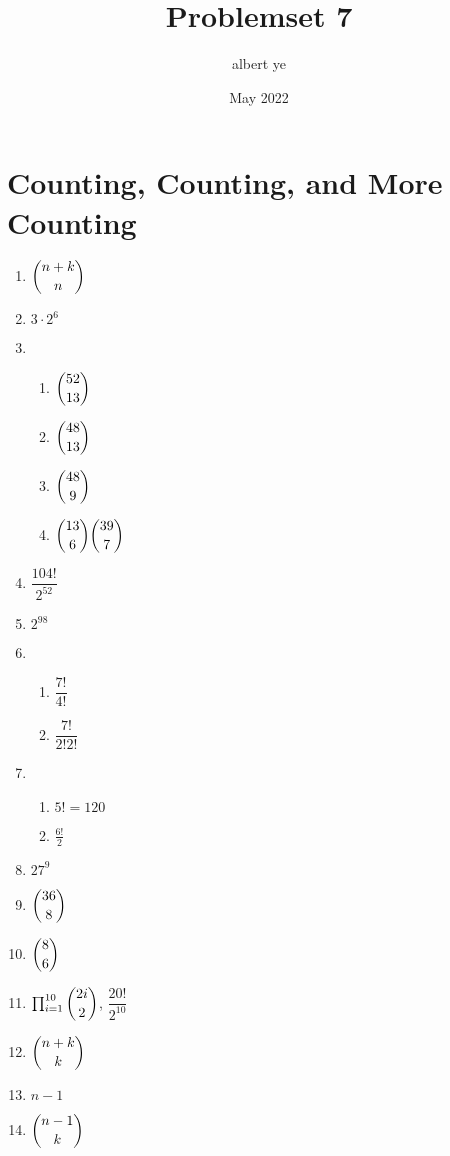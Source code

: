 \documentclass{article}
\title{Problemset 7}
\author{albert ye}
\date{May 2022}
\begin{document}
	\maketitle
	\section{Counting, Counting, and More Counting}
	\begin{enumerate}[label=\alph*)]
		\item $\dbinom{n+k}{n}$
		\item $3 \cdot 2^6$
		\item 
			\begin{enumerate}[label=(\roman*)]
				\item $\dbinom{52}{13}$
				\item $\dbinom{48}{13}$
				\item $\dbinom{48}{9}$
				\item $\dbinom{13}{6} \dbinom{39}{7}$
			\end{enumerate}
		\item $\dfrac{104!}{2^{52}}$
		\item $2^{98}$
		\item 
			\begin{enumerate}[label=(\roman*)]
				\item $\dfrac{7!}{4!}$
				\item $\dfrac{7!}{2!2!}$
			\end{enumerate}
		\item 
			\begin{enumerate}[label=(\roman*)]
				\item $5! = 120$
				\item $\frac{6!}{2}$
			\end{enumerate}
		\item $27^9$
		\item $\dbinom{36}{8}$
		\item $\dbinom{8}{6}$
		\item $\prod_{i=1}^{10} \dbinom{2i}{2}$, $\dfrac{20!}{2^{10}}$
		\item $\dbinom{n+k}{k}$
		\item $n-1$
		\item $\dbinom{n-1}{k}$
	\end{enumerate}
\end{document}
